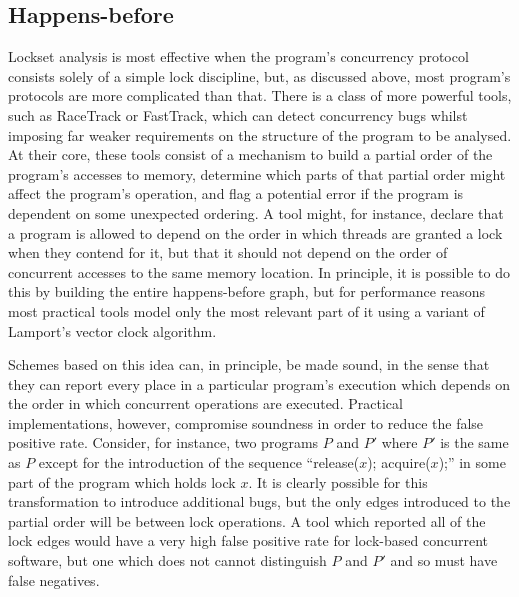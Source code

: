 \subsection{Happens-before}

Lockset analysis is most effective when the program's concurrency
protocol consists solely of a simple lock discipline, but, as
discussed above, most program's protocols are more complicated than
that.  There is a class of more powerful tools, such as
RaceTrack\cite{Yu2005} or FastTrack\cite{Flanagan2009}, which can
detect concurrency bugs whilst imposing far weaker requirements on the
structure of the program to be analysed.  At their core, these tools
consist of a mechanism to build a partial order of the program's
accesses to memory, determine which parts of that partial order might
affect the program's operation, and flag a potential error if the
program is dependent on some unexpected ordering.  A tool might, for
instance, declare that a program is allowed to depend on the order in
which threads are granted a lock when they contend for it, but that it
should not depend on the order of concurrent accesses to the same
memory location.  In principle, it is possible to do this by building
the entire happens-before graph\cite{Netzer1991}, but for performance
reasons most practical tools model only the most relevant part of it
using a variant of Lamport's vector clock algorithm\cite{Lamport1978}.

Schemes based on this idea can, in principle, be made sound, in the
sense that they can report every place in a particular program's
execution which depends on the order in which concurrent operations
are executed.  Practical implementations, however, compromise
soundness in order to reduce the false positive rate.  Consider, for
instance, two programs $P$ and $P'$ where $P'$ is the same as $P$
except for the introduction of the sequence ``release($x$);
acquire($x$);'' in some part of the program which holds lock $x$.  It
is clearly possible for this transformation to introduce additional
bugs, but the only edges introduced to the partial order will be
between lock operations.  A tool which reported all of the lock edges
would have a very high false positive rate for lock-based concurrent
software, but one which does not cannot distinguish $P$ and $P'$ and
so must have false negatives.

